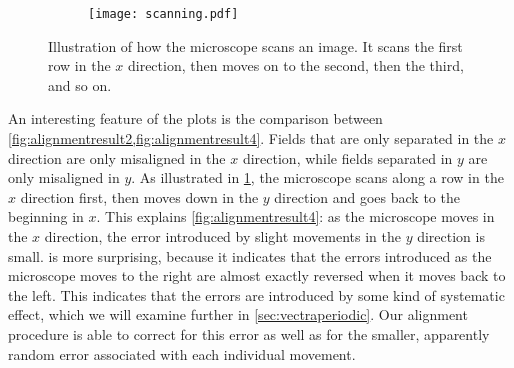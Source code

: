 \documentclass{article}
\begin{document}
\begin{figure}[ht]
	\centering
	\begin{subfigure}{0.45\linewidth}
		\texttt{[image: scanning.pdf]}
	\end{subfigure}
	\caption{Illustration of how the microscope scans an image.  It scans the first row in the $x$ direction, then moves on to the second, then the third, and so on.}
	\label{fig:scanning}
\end{figure}

An interesting feature of the plots is the comparison between \cref{fig:alignmentresult2,fig:alignmentresult4}.  Fields that are only separated in the $x$ direction are only misaligned in the $x$ direction, while fields separated in $y$ are only misaligned in $y$.  As illustrated in \cref{fig:scanning}, the microscope scans along a row in the $x$ direction first, then moves down in the $y$ direction and goes back to the beginning in $x$.  This explains \cref{fig:alignmentresult4}: as the microscope moves in the $x$ direction, the error introduced by slight movements in the $y$ direction is small.   is more surprising, because it indicates that the errors introduced as the microscope moves to the right are almost exactly reversed when it moves back to the left.  This indicates that the errors are introduced by some kind of systematic effect, which we will examine further in \cref{sec:vectraperiodic}.  Our alignment procedure is able to correct for this error as well as for the smaller, apparently random error associated with each individual movement.
\end{document}

